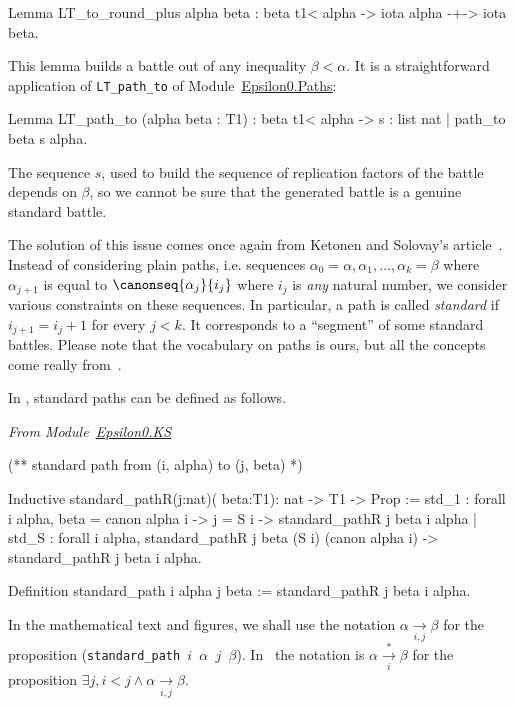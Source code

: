 \begin{Coqsrc}
Lemma LT_to_round_plus alpha beta :
    beta t1< alpha ->  iota alpha -+-> iota beta.
\end{Coqsrc}

This lemma builds a battle out of any inequality $\beta<\alpha$. 
It is a straightforward application of \texttt{LT\_path\_to} of
Module~\href{../theories/html/hydras.Epsilon0.Paths.html}{Epsilon0.Paths}:

\begin{Coqsrc}
Lemma LT_path_to (alpha beta : T1) :
  beta t1< alpha -> {s : list nat | path_to beta s alpha}.
\end{Coqsrc}

The sequence $s$, used to build the sequence of replication factors of the battle depends on 
$\beta$, so we cannot be sure that the generated battle is a genuine standard battle.


The solution of this issue comes  once again from Ketonen and Solovay's article~\cite{KS81}. Instead of considering plain paths, i.e. sequences 
$\alpha_0=\alpha,\alpha_1,\dots,\alpha_k=\beta$ where $\alpha_{j+1}$ is equal
to $\canonseq{\alpha_j}{i_j}$ where $i_j$ is \emph{any} natural number, 
we consider various constraints on these sequences.
In particular, a path is called \emph{standard} if $i_{j+1} = i_j + 1$ for every $j<k$.
It  corresponds to a ``segment'' of some standard battles. 
Please note that the vocabulary on paths is ours, but all the concepts come really from~\cite{KS81}.

In \coq{}, standard paths can be defined as follows.

\vspace{4pt}
\emph{From Module~\href{../theories/html/hydras.Epsilon0.KS.html}{Epsilon0.KS}}

\begin{Coqsrc}
(**  standard path from (i, alpha) to (j, beta) *)

Inductive standard_pathR(j:nat)( beta:T1):  nat -> T1 -> Prop :=
  std_1 : forall i alpha, 
       beta = canon alpha i -> j = S i ->
       standard_pathR j beta i  alpha
| std_S : forall i alpha, 
      standard_pathR j beta (S i) (canon alpha i)  ->
      standard_pathR j beta i alpha.

Definition standard_path  i alpha j beta := 
   standard_pathR j beta i alpha.
\end{Coqsrc}

In the mathematical text and figures, we shall use the notation 
$\alpha \xrightarrow[i,j]{}\beta$ for the proposition 
(\texttt{standard\_path $i$ $\alpha$ $j$ $\beta$}).
In~\cite{KS81} the notation is
$\alpha \xrightarrow[i]{*}\beta$
for 
the proposition  $\exists j, i<j \wedge \alpha \xrightarrow[i,j]{} \beta$.



